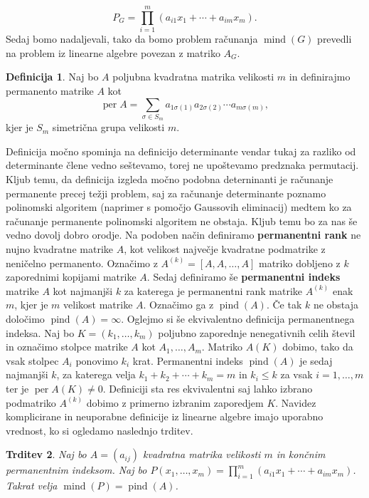 \documentclass[12pt,a4paper,twoside]{article}
\theoremstyle{definition} %
\newtheorem{definicija}{Definicija}[section]
\theoremstyle{plain} %
\newtheorem{trditev}[definicija]{Trditev}
\numberwithin{equation}{section}  %
\DeclareMathOperator{\per}{per}
\DeclareMathOperator{\mind}{mind}
\DeclareMathOperator{\pind}{pind}
\begin{document}
$$P_G = \prod_{i=1}^m (a_{i1}x_1 + \cdots + a_{im}x_m).$$
Sedaj bomo nadaljevali, tako da bomo problem računanja $\mind(G)$ prevedli na problem iz linearne algebre povezan z matriko $A_G$. 
 \begin{definicija}
Naj bo $A$ poljubna kvadratna matrika velikosti $m$ in definirajmo permanento matrike $A$ kot 
$$ \per A = \sum_{\sigma \in S_m} a_{1\sigma(1)} a_{2\sigma(2)} \cdots  a_{m\sigma(m)} ,$$
kjer je $S_m$ simetrična grupa velikosti $m$.
\end{definicija}
Definicija močno spominja na definicijo determinante vendar tukaj za razliko od determinante člene vedno seštevamo, torej ne upoštevamo predznaka permutacij. Kljub temu, da definicija izgleda močno podobna deterninanti je računanje permanente precej težji problem, saj za računanje determinante poznamo polinomski algoritem (naprimer s pomočjo Gaussovih eliminacij) medtem ko za računanje permanente polinomski algoritem ne obstaja. Kljub temu bo za nas še vedno dovolj dobro orodje. Na podoben način definiramo \textbf{permanentni rank} ne nujno kvadratne matrike $A$, kot velikost največje kvadratne podmatrike z neničelno permanento. Označimo  z $A^{(k)} = [A,A, \ldots, A]$ matriko dobljeno z $k$ zaporednimi kopijami matrike $A$. Sedaj definiramo še \textbf{permanentni indeks} matrike $A$ kot najmanjši $k$ za katerega je permanentni rank matrike $A^{(k)}$ enak $m$, kjer je $m$ velikost matrike $A$. Označimo  ga z $\pind(A)$. Če tak $k$ ne obstaja določimo $\pind(A) = \infty$. Oglejmo si še ekvivalentno definicija permanentnega indeksa. Naj bo $K = (k_1, \ldots, k_m)$ poljubno zaporednje nenegativnih celih števil in označimo stolpce matrike $A$ kot $A_1, \ldots, A_m$. Matriko $A(K)$ dobimo, tako da vsak stolpec $A_i$ ponovimo $k_i$ krat. Permanentni indeks $\pind(A)$ je sedaj najmanjši $k$, za katerega velja $k_1 + k_2 + \cdots + k_m = m$ in $k_i \le k$ za vsak $i = 1, \ldots, m$ ter je $\per A(K) \neq 0$. Definiciji sta res ekvivalentni saj lahko izbrano podmatriko $A^{(k)}$ dobimo z primerno izbranim zaporedjem $K$. Navidez komplicirane in neuporabne definicije iz linearne algebre imajo uporabno vrednost, ko si ogledamo naslednjo trditev.

\begin{trditev}
\label{mpind}
Naj bo $A = (a_{ij})$ kvadratna matrika velikosti $m$ in končnim permanentnim indeksom. Naj bo $P(x_1, \ldots, x_m) = \prod_{i=1}^m (a_{i1}x_1 + \cdots + a_{im}x_m)$. Takrat velja $\mind(P) = \pind(A)$.
\end{trditev}
\end{document}
